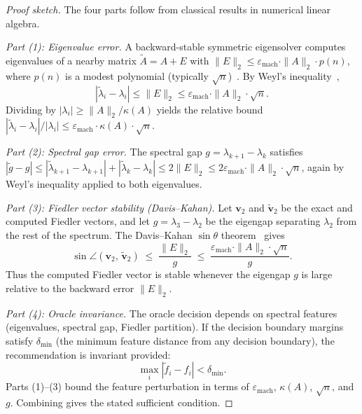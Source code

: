 \documentclass[11pt]{article}
\begin{document}
\begin{proof}[Proof sketch]
The four parts follow from classical results in numerical linear algebra.

\emph{Part (1): Eigenvalue error.}
A backward-stable symmetric eigensolver computes eigenvalues of a nearby matrix $\tilde{A} = A + E$ with $\|E\|_2 \leq \varepsilon_{\mathrm{mach}} \cdot \|A\|_2 \cdot p(n)$, where $p(n)$ is a modest polynomial (typically $\sqrt{n}$)~\cite{demmel1997}.  By Weyl's inequality~\cite{weyl1912},
\[
  |\tilde{\lambda}_i - \lambda_i| \leq \|E\|_2 \leq \varepsilon_{\mathrm{mach}} \cdot \|A\|_2 \cdot \sqrt{n}.
\]
Dividing by $|\lambda_i| \geq \|A\|_2 / \kappa(A)$ yields the relative bound $|\tilde{\lambda}_i - \lambda_i|/|\lambda_i| \leq \varepsilon_{\mathrm{mach}} \cdot \kappa(A) \cdot \sqrt{n}$.

\emph{Part (2): Spectral gap error.}
The spectral gap $g = \lambda_{k+1} - \lambda_k$ satisfies $|\tilde{g} - g| \leq |\tilde{\lambda}_{k+1} - \lambda_{k+1}| + |\tilde{\lambda}_k - \lambda_k| \leq 2\|E\|_2 \leq 2\varepsilon_{\mathrm{mach}} \cdot \|A\|_2 \cdot \sqrt{n}$, again by Weyl's inequality applied to both eigenvalues.

\emph{Part (3): Fiedler vector stability (Davis--Kahan).}
Let $\mathbf{v}_2$ and $\tilde{\mathbf{v}}_2$ be the exact and computed Fiedler vectors, and let $g = \lambda_3 - \lambda_2$ be the eigengap separating $\lambda_2$ from the rest of the spectrum.  The Davis--Kahan $\sin\theta$ theorem~\cite{daviskahan1970} gives
\[
  \sin\angle(\mathbf{v}_2,\, \tilde{\mathbf{v}}_2) \;\leq\; \frac{\|E\|_2}{g}
  \;\leq\; \frac{\varepsilon_{\mathrm{mach}} \cdot \|A\|_2 \cdot \sqrt{n}}{g}.
\]
Thus the computed Fiedler vector is stable whenever the eigengap $g$ is large relative to the backward error $\|E\|_2$.

\emph{Part (4): Oracle invariance.}
The oracle decision depends on spectral features (eigenvalues, spectral gap, Fiedler partition).  If the decision boundary margins satisfy $\delta_{\min}$ (the minimum feature distance from any decision boundary), the recommendation is invariant provided:
\[
  \max_i |\tilde{f}_i - f_i| < \delta_{\min}.
\]
Parts (1)--(3) bound the feature perturbation in terms of $\varepsilon_{\mathrm{mach}}$, $\kappa(A)$, $\sqrt{n}$, and $g$.  Combining gives the stated sufficient condition.
\end{proof}
\end{document}
